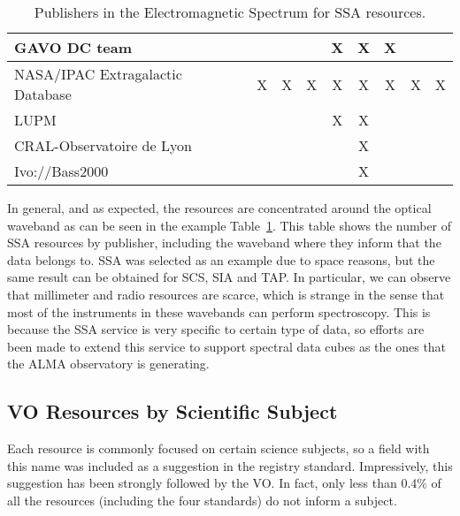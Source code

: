 \begin{table}
\begin{center}
\begin{tabular}{|l|c|c|c|c|c|c|c|c|}
\hline
  GAVO DC team  & & & & X & X & X & & \\
\hline
  NASA/IPAC Extragalactic Database & X & X & X & X & X & X & X & X \\
\hline
  LUPM & & & & X & X & & & \\
\hline
  CRAL-Observatoire de Lyon & & & & & X & & & \\
\hline
  Ivo://Bass2000 & & & & & X & & & \\
\hline
\end{tabular}
\label{tab:SSAEMS}
\caption{Publishers in the Electromagnetic Spectrum for SSA resources.}
\end{center}
\end{table}

In general, and as expected, the resources are concentrated around the optical waveband as can be
seen in the example Table~\ref{tab:SSAEMS}. This table shows the number of SSA resources by publisher,
including the waveband where they inform that the data belongs to. SSA was selected as an example due to
space reasons, but the same result can be obtained for SCS, SIA and TAP. In particular, we can observe that
millimeter and radio resources are scarce, which is strange in the sense that most of the instruments in these
wavebands can perform spectroscopy. This is because the SSA service is very specific to certain type of
data, so efforts are been made to extend this service to support spectral data cubes as the ones that
the ALMA observatory is generating. 

\subsection{VO Resources by Scientific Subject}

Each resource is commonly focused on certain science subjects, so a field with this name was included
as a suggestion in the registry standard. Impressively, this suggestion has been strongly followed by the VO.
In fact, only less than 0.4\% of all the resources (including the four standards) do not inform a subject. 

